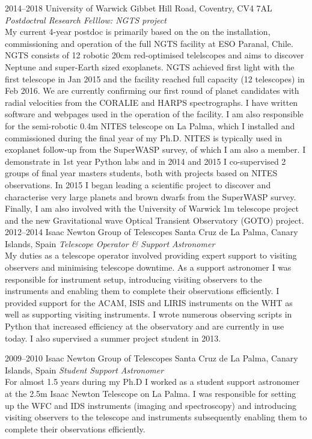 \documentclass[print]{friggeri-cv} %
\begin{document}
\begin{entrylist}
\entry
{2014--2018}
{University of Warwick}
{Gibbet Hill Road, Coventry, CV4 7AL}
{\emph{Postdoctral Research Felllow: NGTS project}\\
My current 4-year postdoc is primarily based on the on the installation, commissioning and operation of the full NGTS facility at ESO Paranal, Chile. NGTS consists of 12 robotic 20cm red-optimised telelscopes and aims to discover Neptune and super-Earth sized exoplanets. NGTS achieved first light with the first telescope in Jan 2015 and the facility reached full capacity (12 telescopes) in Feb 2016. We are currently confirming our first round of planet candidates with radial velocities from the CORALIE and HARPS spectrographs. I have written software and webpages used in the operation of the facility. I am also responsible for the semi-robotic 0.4m NITES telescope on La Palma, which I installed and commissioned during the final year of my Ph.D. NITES is typically used in exoplanet follow-up from the SuperWASP survey, of which I am also a member. I demonstrate in 1st year Python labs and in 2014 and 2015 I co-supervised 2 groups of final year masters students, both with projects based on NITES observations. In 2015 I began leading a scientific project to discover and characterise very large planets and brown dwarfs from the SuperWASP survey. Finally, I am also involved with the University of Warwick 1m telescope project and the new Gravitational wave Optical Transient Observatory (GOTO) project. } 
\entry
{2012--2014}
{Isaac Newton Group of Telescopes}
{Santa Cruz de La Palma, Canary Islands, Spain}
{\emph{Telescope Operator \& Support Astronomer}\\
My duties as a telescope operator involved providing expert support to visiting observers and minimising telescope downtime. As a support astronomer I was responsible for instrument setup, introducing visiting observers to the instruments and enabling them to complete their observations efficiently. I provided support for the ACAM, ISIS and LIRIS instruments on the WHT as well as supporting visiting instruments. I wrote numerous observing scripts in Python that increased efficiency at the observatory and are currently in use today. I also supervised a summer project student in 2013.
} 
\end{entrylist}
\begin{entrylist}
\entry
{2009--2010}
{Isaac Newton Group of Telescopes}
{Santa Cruz de La Palma, Canary Islands, Spain}
{\emph{Student Support Astronomer} \\
For almost 1.5 years during my Ph.D I worked as a student support astronomer at the 2.5m Isaac Newton Telescope on La Palma. I was responsible for setting up the WFC and IDS instruments (imaging and spectroscopy) and introducing visiting observers to the telescope and instruments subsequently enabling them to complete their observations efficiently.}
\end{entrylist}
\end{document}
